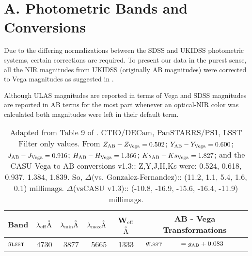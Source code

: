 \documentclass[usenatbib]{mnras}
\begin{document}
\section{A. Photometric Bands and Conversions}
    Due to the differing normalizations between the
    SDSS and  UKIDSS photometric systems, certain corrections are required.  To present
    our data in the  purest sense, all the NIR magnitudes from UKIDSS
    (originally AB magnitudes)  were corrected to Vega magnitudes as
    suggested in \citet{Hewett2006}.
    
    Although ULAS magnitudes are reported in terms of Vega and SDSS
    magnitudes are reported in AB terms for the most part whenever an
    optical-NIR color was calculated both magnitudes were left in their
    default term.
    
\begin{table*}
  \begin{center}
   \caption{Adapted from Table 9 of \citet{Peth2011}. 
CTIO/DECam, PanSTARRS/PS1, LSST
Filter only values. 
From \citet{GonzalezFernandez2018} 
$Z_{\rm AB}   -  Z_{\rm Vega}  = 0.502$;  
$Y_{\rm AB}  -  Y_{\rm Vega}    = 0.600 $;
$J_{\rm AB}   -  J_{\rm Vega}    = 0.916  $;
$H_{\rm AB}  -  H_{\rm Vega}    = 1.366 $;
$Ks_{\rm AB}  -  Ks_{\rm Vega}  = 1.827 $;
and the CASU Vega to AB conversions v1.3:: 
	Z,Y,J,H,Ks were: 0.524, 0.618, 0.937, 1.384, 1.839. 
So, $\Delta$(vs. Gonzalez-Fernandez)::
	(11.2,     1.1,    5.4,     1.6,    0.1) millimags. 
$\Delta$(vsCASU v1.3)::
	(-10.8, -16.9, -15.6,  -16.4, -11.9) millimags. 
}
    \setlength{\tabcolsep}{4pt}
     \begin{tabular}{l r r r  c l l}
      \hline
      \hline
      Band & $\lambda_{\rm eff}  {\buildrel _{\circ} \over {\mathrm{A}}}$ 
              &  $\lambda_{\rm min} {\buildrel _{\circ} \over {\mathrm{A}}}$ 
              & $\lambda_{\rm max} {\buildrel _{\circ} \over {\mathrm{A}}}$ 
              & W$_{\rm eff}$ ${\buildrel _{\circ} \over {\mathrm{A}}}$ 
              & \multicolumn{2}{c}{AB - Vega  Transformations} \\
      \hline
      $g_{\rm LSST}$      &     4730     &	  3877    &	   5665   &  1333   &  $g_{\rm LSST}$       &$ = g_{\rm AB} +  0.083 $ \\   %

\end{tabular}
\end{center}
\end{table*}
\end{document}
